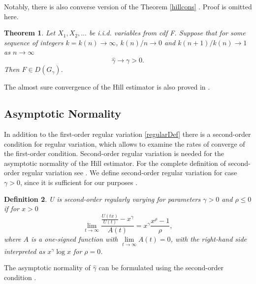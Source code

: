 \documentclass[english,12pt,a4paper,pdftex,sci,utf8]{aaltothesis} %
\newtheorem{theorem}{Theorem}[section]
\newtheorem{definition}[theorem]{Definition}
\begin{document}
Notably, there is also converse version of the Theorem \ref{hillcons} \cite{mason}. Proof is omitted here.

\begin{theorem}
Let $X_1, X_2,...$ be i.i.d. variables from cdf F. Suppose that for some sequence of integers $k=k(n) \rightarrow \infty$, $k(n)/n \rightarrow 0$ and $k(n+1)/k(n) \rightarrow 1$ as $n \rightarrow \infty$
\begin{equation*}
\hat{\gamma} \rightarrow \gamma > 0.
\end{equation*}
Then $F \in D(G_{\gamma})$.
\end{theorem}

The almost sure convergence of the Hill estimator is also proved in \cite{mason}.

\subsection{Asymptotic Normality}


In addition to the first-order regular variation \ref{regularDef} there is a second-order condition for regular variation, which allows to examine the rates of converge of the first-order condition. Second-order regular variation is needed for the asymptotic normality of the Hill estimator. For the complete definition of second-order regular variation see \cite{geluk}. We define second-order regular variation for case $\gamma > 0$, since it is sufficient for our purposes \cite{deHaan}.

\begin{definition}
U is second-order regularly varying for parameters $\gamma>0$ and $\rho \leq 0$ if for $x>0$
\begin{equation*}
\lim_{t \rightarrow \infty} \frac{\frac{U(tx)}{U(t)}-x^{\gamma}}{A(t)} = x^{\gamma} \frac{x^{\rho}-1}{\rho},
\end{equation*}
where $A$ is a one-signed function with $\lim\limits_{t \rightarrow \infty} A(t)=0$, with the right-hand side interpreted as $x^\gamma \log x$ for $\rho = 0$.
\label{2RV}
\end{definition}


The asymptotic normality of $\hat{\gamma}$ can be formulated using the second-order condition \cite{peng}.
\end{document}
